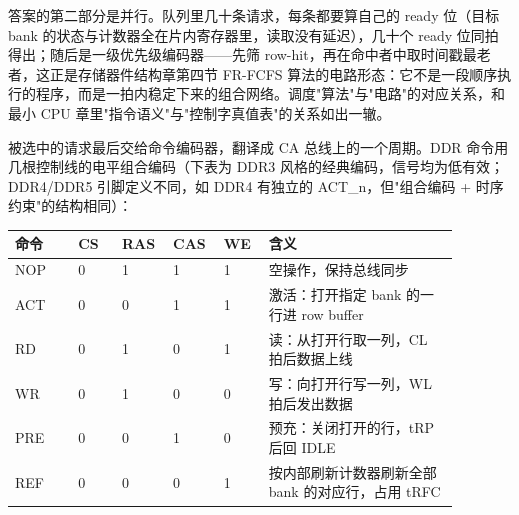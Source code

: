 答案的第二部分是并行。队列里几十条请求，每条都要算自己的 ready 位（目标 bank 的状态与计数器全在片内寄存器里，读取没有延迟），几十个 ready 位同拍得出；随后是一级优先级编码器——先筛 row-hit，再在命中者中取时间戳最老者，这正是存储器件结构章第四节 FR-FCFS 算法的电路形态：它不是一段顺序执行的程序，而是一拍内稳定下来的组合网络。调度"算法"与"电路"的对应关系，和最小 CPU 章里"指令语义"与"控制字真值表"的关系如出一辙。

被选中的请求最后交给命令编码器，翻译成 CA 总线上的一个周期。DDR 命令用几根控制线的电平组合编码（下表为 DDR3 风格的经典编码，信号均为低有效；DDR4/DDR5 引脚定义不同，如 DDR4 有独立的 ACT\_n，但"组合编码 + 时序约束"的结构相同）：

\begin{longtable}{L{0.13\linewidth}L{0.09\linewidth}L{0.09\linewidth}L{0.09\linewidth}L{0.09\linewidth}L{0.39\linewidth}}
\toprule
命令 & CS & RAS & CAS & WE & 含义 \\
\midrule
NOP & 0 & 1 & 1 & 1 & 空操作，保持总线同步 \\
ACT & 0 & 0 & 1 & 1 & 激活：打开指定 bank 的一行进 row buffer \\
RD & 0 & 1 & 0 & 1 & 读：从打开行取一列，CL 拍后数据上线 \\
WR & 0 & 1 & 0 & 0 & 写：向打开行写一列，WL 拍后发出数据 \\
PRE & 0 & 0 & 1 & 0 & 预充：关闭打开的行，tRP 后回 IDLE \\
REF & 0 & 0 & 0 & 1 & 按内部刷新计数器刷新全部 bank 的对应行，占用 tRFC \\
\bottomrule
\end{longtable}

